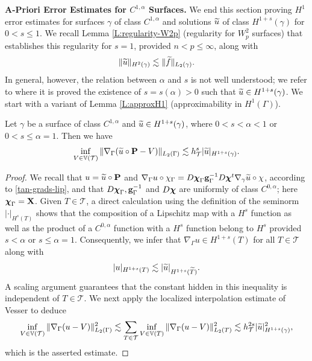 \medskip\noindent
{\bf A-Priori Error Estimates for $C^{1,\alpha}$ Surfaces.}
We end this section proving $H^1$ error estimates for surfaces $\gamma$
of class $C^{1,\alpha}$ and solutions $\widetilde{u}$ of class $H^{1+s}(\gamma)$ for $0<s\le 1$.
We recall Lemma \ref{L:regularity-W2p} (regularity for $W^2_p$ surfaces) that establishes
this regularity for $s=1$, provided $n< p \le \infty$, along with
%
\[
\|\widetilde{u}\|_{H^2(\gamma)} \lesssim \|\widetilde{f}\|_{L_2(\gamma)}.
\]
%
In general, however,
the relation between $\alpha$ and $s$ is not well understood; we refer to
\cite{BDO19} where it is proved the existence of $s=s(\alpha)>0$ such that
$\widetilde{u} \in H^{1+s}(\gamma)$. We start with a variant of Lemma \ref{L:approxH1}
(approximability in $H^1(\Gamma)$).


\begin{lemma}\label{L:approxH1-C1a}
Let $\gamma$ be a surface of class $C^{1,\alpha}$ and $\widetilde{u} \in H^{1+s}(\gamma)$,
where $0<s<\alpha<1$ or $0<s\le \alpha=1$.
Then we have
\begin{equation}
\label{opt_approx2}
\inf_{V \in \mathbb{V}(\mathcal{T})} \|\nabla_\Gamma(\widetilde{u} \circ {\bf P} -V)\|_{L_2(\Gamma)}
\lesssim h_{\mathcal{T}}^s |\widetilde{u}|_{H^{1+s}(\gamma)}.
\end{equation}
\end{lemma}
%
\begin{proof}
We recall that $u=\widetilde{u}\circ{\bf P}$ and $\nabla_\Gamma u \circ \chi_\Gamma = D {\boldsymbol \chi}_\Gamma {\bf g}_\Gamma^{-1} D{\boldsymbol \chi}^t \nabla_\gamma \widetilde u \circ \chi$, according to \eqref{tan-grads-lip}, and that $D {\boldsymbol \chi}_\Gamma, {\bf g}_\Gamma^{-1}$ and $D{\boldsymbol \chi}$ are uniformly of class $C^{0,\alpha}$; here ${\boldsymbol \chi}_\Gamma={\bf X}$. Given $T\in\mathcal T$, a direct calculation using the definition of the seminorm $|\cdot|_{H^s(T)}$ shows that the composition of a Lipschitz map with a $H^s$ function as well as the product of a $C^{0,\alpha}$ function with a $H^s$ function belong to $H^s$ provided $s<\alpha$ or $s\le\alpha=1$. Consequently, we infer that $\nabla_\Gamma u \in H^{1+s}(T)$ for all $T\in\mathcal T$ along with
%
\[  
| u |_{H^{1+s}(T)} \lesssim | \widetilde{u} |_{H^{1+s}(\widetilde T)}.
\]
%
A scaling argument guarantees that the constant hidden in this inequality is independent of $T\in \mathcal T$. We next apply the localized interpolation estimate of
Vesser \cite{Vee15} to deduce
%
\[
\inf_{V \in \mathbb V(\mathcal T)} \| \nabla_\Gamma (u - V)\|_{L_2(\Gamma)}^2 \lesssim 
\sum_{T\in \mathcal T} \inf_{V \in \mathbb V(T)} \| \nabla_\Gamma (u - V)\|_{L_2(T)}^2
\lesssim h_{\mathcal T}^{2s} |\widetilde{u}|_{H^{1+s}(\gamma)}^2,
\]
%
which is the asserted estimate.
\end{proof}  



